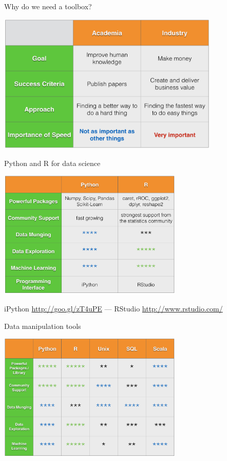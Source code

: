 \documentclass[10pt]{beamer}
\begin{document}
    \begin{frame}{Why do we need a toolbox?}
      \begin{center}
        \includegraphics[width=300pt]{../graphs/academia_industry}
      \end{center}
    \end{frame}

    \begin{frame}{Python and R for data science}
      \begin{center}
        \includegraphics[width=250pt]{../graphs/python_r}
      \end{center}
      {\footnotesize
        iPython \url{http://goo.gl/zT4uPE}
        --- 
        RStudio \url{http://www.rstudio.com/}
      }
    \end{frame}

    \begin{frame}{Data manipulation tools}
      \begin{center}
         \includegraphics[width=250pt]{../graphs/data_tools}
      \end{center}
    \end{frame}
\end{document}
